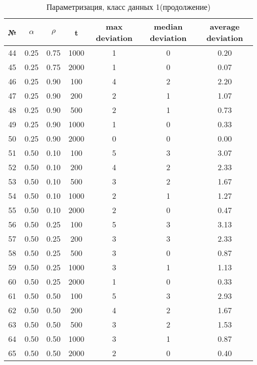 \documentclass[a4paper, 12pt, unknownkeysallowed]{extreport}
\begin{document}
\begin{center}
  \captionsetup{justification=raggedright,singlelinecheck=off}
  \begin{longtable}[c]{|c|c|c|c|c|c|c|}
    \caption{Параметризация, класс данных 1(продолжение)\label{tbl:p_1_2}} \\ \hline
    № & $\alpha$ & $\rho$ & t & max deviation & median deviation & average deviation \\ \hline   
    44 & 0.25 & 0.75 &  1000 &    1 &    0 &  0.20 \\ \hline
    45 & 0.25 & 0.75 &  2000 &    1 &    0 &  0.07 \\ \hline
    46 & 0.25 & 0.90 &   100 &    4 &    2 &  2.20 \\ \hline
    47 & 0.25 & 0.90 &   200 &    2 &    1 &  1.07 \\ \hline
    48 & 0.25 & 0.90 &   500 &    2 &    1 &  0.73 \\ \hline
    49 & 0.25 & 0.90 &  1000 &    1 &    0 &  0.33 \\ \hline
    50 & 0.25 & 0.90 &  2000 &    0 &    0 &  0.00 \\ \hline
    51 & 0.50 & 0.10 &   100 &    5 &    3 &  3.07 \\ \hline
    52 & 0.50 & 0.10 &   200 &    4 &    2 &  2.33 \\ \hline
    53 & 0.50 & 0.10 &   500 &    3 &    2 &  1.67 \\ \hline
    54 & 0.50 & 0.10 &  1000 &    2 &    1 &  1.27 \\ \hline
    55 & 0.50 & 0.10 &  2000 &    2 &    0 &  0.47 \\ \hline
    56 & 0.50 & 0.25 &   100 &    5 &    3 &  3.13 \\ \hline
    57 & 0.50 & 0.25 &   200 &    3 &    3 &  2.33 \\ \hline
    58 & 0.50 & 0.25 &   500 &    3 &    0 &  0.87 \\ \hline
    59 & 0.50 & 0.25 &  1000 &    3 &    1 &  1.13 \\ \hline
    60 & 0.50 & 0.25 &  2000 &    1 &    0 &  0.33 \\ \hline
    61 & 0.50 & 0.50 &   100 &    5 &    3 &  2.93 \\ \hline
    62 & 0.50 & 0.50 &   200 &    4 &    2 &  1.67 \\ \hline
    63 & 0.50 & 0.50 &   500 &    3 &    2 &  1.53 \\ \hline
    64 & 0.50 & 0.50 &  1000 &    3 &    1 &  0.87 \\ \hline
    65 & 0.50 & 0.50 &  2000 &    2 &    0 &  0.40 \\ \hline

\end{longtable}
\end{center}
\end{document}
